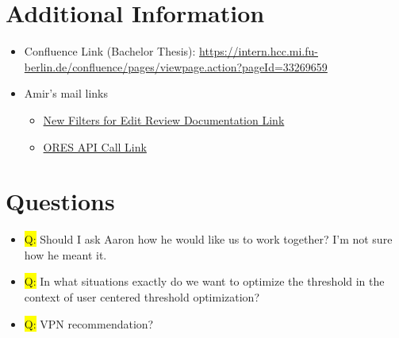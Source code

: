 \documentclass[12pt,a4paper]{article}
\begin{document}
\section*{Additional Information}
\begin{itemize}
\item Confluence Link (Bachelor Thesis): \url{https://intern.hcc.mi.fu-berlin.de/confluence/pages/viewpage.action?pageId=33269659}
\item Amir's mail links
\begin{itemize}
\item \href{https://www.mediawiki.org/wiki/Help:New_filters_for_edit_review/Quality_and_Intent_Filters}{New Filters for Edit Review Documentation Link}
\item \href{https://ores.wikimedia.org/v3/scores/eswiki/?models=damaging&model_info=statistics.thresholds.false.%22maximum+recall+%40+precision+%3E%3D+0.995%22%7Cstatistics.thresholds.true.%22maximum+filter_rate+%40+recall+%3E%3D+0.9%22%7Cstatistics.thresholds.true.%22maximum+recall+%40+precision+%3E%3D+0.6%22%7Cstatistics.thresholds.true.%22maximum+recall+%40+precision+%3E%3D+0.9%22&format=json}{ORES API Call Link}
\end{itemize}
\end{itemize}
\section*{Questions}
\begin{itemize}
%
\item \colorbox{yellow}{Q:} Should I ask Aaron how he would like us to work together? I'm not sure how he meant it.
%
\item \colorbox{yellow}{Q:} In what situations exactly do we want to optimize the threshold in the context of user centered threshold optimization?
%
\item \colorbox{yellow}{Q:} VPN recommendation?
%
\end{itemize}
\end{document}
